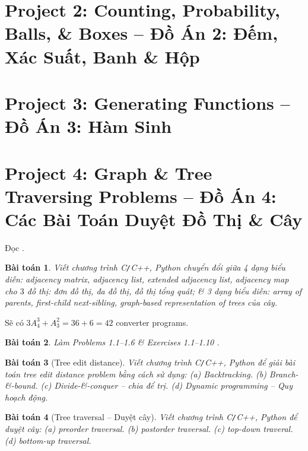 \documentclass{article}
\newtheorem{baitoan}{Bài toán}
\begin{document}

\section{Project 2: Counting, Probability, Balls, \& Boxes -- Đồ Án 2: Đếm, Xác Suất, Banh \& Hộp}


\section{Project 3: Generating Functions -- Đồ Án 3: Hàm Sinh}


\section{Project 4: Graph \& Tree Traversing Problems -- Đồ Án 4: Các Bài Toán Duyệt Đồ Thị \& Cây}
Đọc \cite[1.3: Representation of Trees \& Graphs, p. 23]{Valiente2021}.
\begin{baitoan}
    Viết chương trình {\sf C{\tt/}C++, Python} chuyển đổi giữa 4 dạng biểu diễn: adjacency matrix, adjacency list, extended adjacency list, adjacency map cho $3$ đồ thị: đơn đồ thị, đa đồ thị, đồ thị tổng quát; \& 3 dạng biểu diễn: array of parents, first-child next-sibling, graph-based representation of trees của cây.
\end{baitoan}
Sẽ có $3A_4^3 + A_3^2 = 36 + 6 = 42$ converter programs.

\begin{baitoan}
    Làm Problems 1.1--1.6 \& Exercises 1.1--1.10 \cite[pp. 39--40]{Valiente2021}.
\end{baitoan}

\begin{baitoan}[Tree edit distance]
    Viết chương trình {\sf C{\tt/}C++, Python} để giải bài toán tree edit distance problem bằng cách sử dụng: (a) Backtracking. (b) Branch-\&-bound. (c) Divide-\&-conquer -- chia để trị. (d) Dynamic programming -- Quy hoạch động.
\end{baitoan}

\begin{baitoan}[Tree traversal -- Duyệt cây]
    Viết chương trình {\sf C{\tt/}C++, Python} để duyệt cây: (a) preorder traversal. (b) postorder traversal. (c) top-down traveral. (d) bottom-up traversal.
\end{baitoan}
\end{document}
